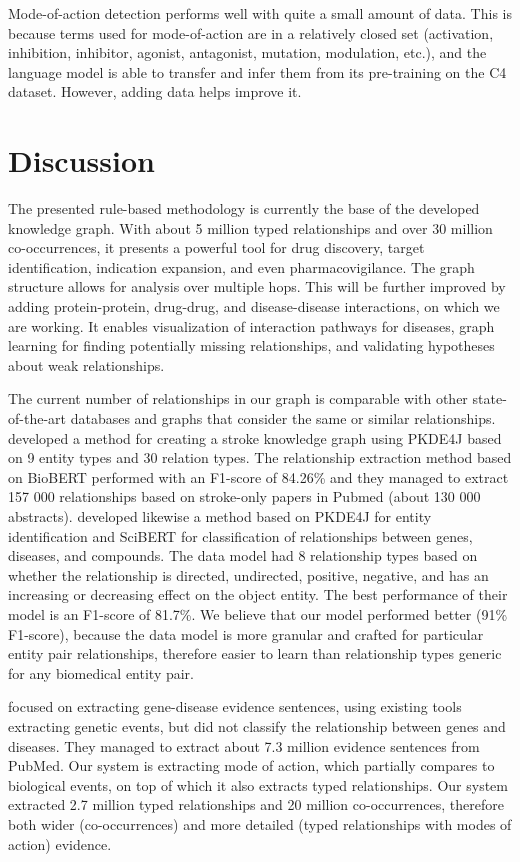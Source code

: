 \documentclass[final,12pt,3p,times,twocolumn,authoryear]{elsarticle}
\begin{document}
Mode-of-action detection performs well with quite a small amount of data. This is because terms used for mode-of-action are in a relatively closed set (activation, inhibition, inhibitor, agonist, antagonist, mutation, modulation, etc.), and the language model is able to transfer and infer them from its pre-training on the C4 dataset. However, adding data helps improve it. 


\section{Discussion}

The presented rule-based methodology is currently the base of the developed knowledge graph. With about 5 million typed relationships and over 30 million co-occurrences, it presents a powerful tool for drug discovery, target identification, indication expansion, and even pharmacovigilance. The graph structure allows for analysis over multiple hops. This will be further improved by adding protein-protein, drug-drug, and disease-disease interactions, on which we are working. It enables visualization of interaction pathways for diseases, graph learning for finding potentially missing relationships, and validating hypotheses about weak relationships. 

The current number of relationships in our graph is comparable with other state-of-the-art databases and graphs that consider the same or similar relationships. 	\cite{yang2021mining} developed a method for creating a stroke knowledge graph using PKDE4J based on 9 entity types and 30 relation types. The relationship extraction method based on BioBERT performed with an F1-score of 84.26\% and they managed to extract 157 000 relationships based on stroke-only papers in Pubmed (about 130 000 abstracts). \cite{lee2022bertsrc} developed likewise a method based on PKDE4J for entity identification and SciBERT for classification of relationships between genes, diseases, and compounds. The data model had 8 relationship types based on whether the relationship is directed, undirected, positive, negative, and has an increasing or decreasing effect on the object entity. The best performance of their model is an F1-score of 81.7\%. We believe that our model performed better (91\% F1-score), because the data model is more granular and crafted for particular entity pair relationships, therefore easier to learn than relationship types generic for any biomedical entity pair. 

\cite{kim2017analysis} focused on extracting gene-disease evidence sentences, using existing tools extracting genetic events, but did not classify the relationship between genes and diseases. They managed to extract about 7.3 million evidence sentences from PubMed. Our system is extracting mode of action, which partially compares to biological events, on top of which it also extracts typed relationships. Our system extracted 2.7 million typed relationships and 20 million co-occurrences, therefore both wider (co-occurrences) and more detailed (typed relationships with modes of action) evidence.
\end{document}
